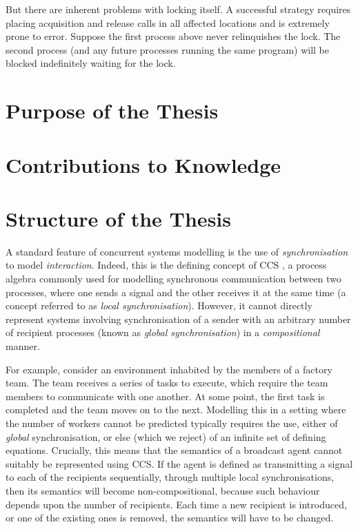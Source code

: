 But there are inherent problems with locking itself.  A successful
strategy requires placing acquisition and release calls in all
affected locations and is extremely prone to error.  Suppose the first
process above never relinquishes the lock.  The second process (and
any future processes running the same program) will be blocked
indefinitely waiting for the lock.

\section{Purpose of the Thesis}

\section{Contributions to Knowledge}

\section{Structure of the Thesis}

A standard feature of concurrent systems modelling is the use of
\emph{synchronisation} to model \emph{interaction}. Indeed, this is the
defining concept of CCS \cite{milner:ccs}, a process algebra commonly
used for modelling synchronous communication between two processes,
where one sends a signal and the other receives it at the same time (a
concept referred to as \emph{local synchronisation}).  However, it
cannot directly represent systems involving synchronisation of a sender
with an arbitrary number of recipient processes (known as \emph{global
synchronisation}) in a \emph{compositional} manner.  

For example, consider an environment inhabited by the members of a
factory team. The team receives a series of tasks to execute, which
require the team members to communicate with one another. At some point,
the first task is completed and the team moves on to the next. Modelling
this in a setting where the number of workers cannot be predicted
typically requires the use, either of \emph{global} synchronisation, or
else (which we reject) of an infinite set of defining equations.
Crucially, this means that the semantics of a broadcast agent cannot
suitably be represented using CCS.  If the agent is defined as
transmitting a signal to each of the recipients sequentially, through
multiple local synchronisations, then its semantics will become
non-compositional, because such behaviour depends upon the number of
recipients.  Each time a new recipient is introduced, or one of the
existing ones is removed, the semantics will have to be changed.

